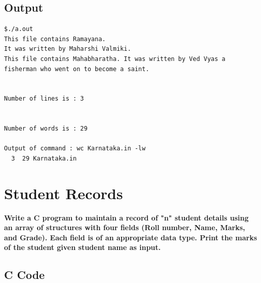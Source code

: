 \documentclass[a4paper]{report}
\begin{document}
\section*{Output}
\begin{Verbatim}
$./a.out 
This file contains Ramayana.
It was written by Maharshi Valmiki.
This file contains Mahabharatha. It was written by Ved Vyas a fisherman who went on to become a saint.


Number of lines is : 3


Number of words is : 29

Output of command : wc Karnataka.in -lw
  3  29 Karnataka.in

\end{Verbatim}

\chapter{Student Records}
{\selectfont \textbf{Write a C program to maintain a record of "n" student details using an array of structures with four fields (Roll number, Name, Marks, and Grade). Each field is of an appropriate data type. Print the marks of the student given student name as input.
}}

\section*{C Code}
\end{document}
